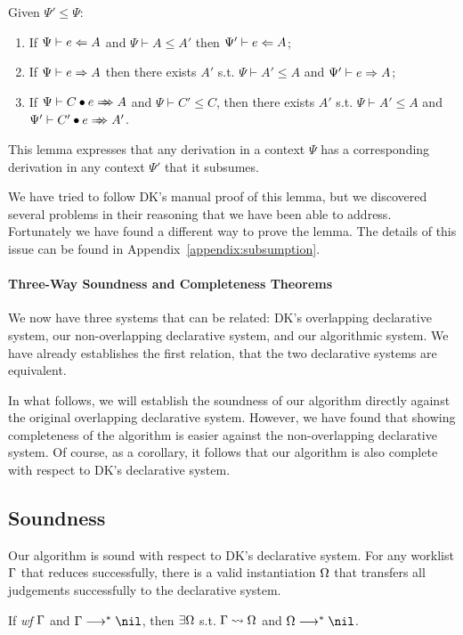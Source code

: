 \begin{lemma}[Subsumption]\label{lem:subsumption}
Given $\Psi' \le \Psi$:
\begin{enumerate}
    \item If $\Psi \vdash e \Leftarrow A$ and $\Psi \vdash A \le A'$ then $\Psi' \vdash e \Leftarrow A$;
    \item If $\Psi \vdash e \Rightarrow A$ then there exists
        $A'$ s.t. $\Psi \vdash A' \le A$ and $\Psi' \vdash e \Rightarrow A$;
    \item If $\Psi \vdash \appInf{C}{e}{A}$ and $\Psi \vdash C' \le C$,
        then there exists $A'$ s.t. $\Psi \vdash A' \le A$ and $\Psi' \vdash \appInf{C'}{e}{A'}$.
\end{enumerate}
\end{lemma}
This lemma expresses that any derivation in a context $\Psi$ has a corresponding derivation in any context
$\Psi'$ that it subsumes.

We have tried to follow DK's manual proof of this lemma,
but we discovered several problems in their reasoning that we have been able to address.
Fortunately we have found a different way to prove the lemma.
The details of this issue can be found in Appendix~\ref{appendix:subsumption}.

\paragraph{Three-Way Soundness and Completeness Theorems}
We now have three systems that can be related: DK's overlapping declarative system,
our non-overlapping declarative system, and our algorithmic system.
We have already establishes the first relation, that the two declarative
systems are equivalent.

In what follows, we will establish the soundness of our algorithm directly
against the original overlapping declarative system. However, we have found
that showing completeness of the algorithm is easier against the
non-overlapping declarative system. Of course, as a corollary, it follows that
our algorithm is also complete with respect to DK's declarative system.

\subsection{Soundness}

Our algorithm is sound with respect to DK's declarative system.
For any worklist $\Gamma$ that reduces successfully,
there is a valid instantiation $\Omega$ that transfers all judgements successfully to the declarative system.
\begin{theorem}[Soundness]
If \emph{wf }$\Gamma$ and $\Gm \redto \nil$, then $\exists \Omega$ s.t. $\Gamma\rightsquigarrow\Omega$ and $\Om\redto\nil$.
\end{theorem}

